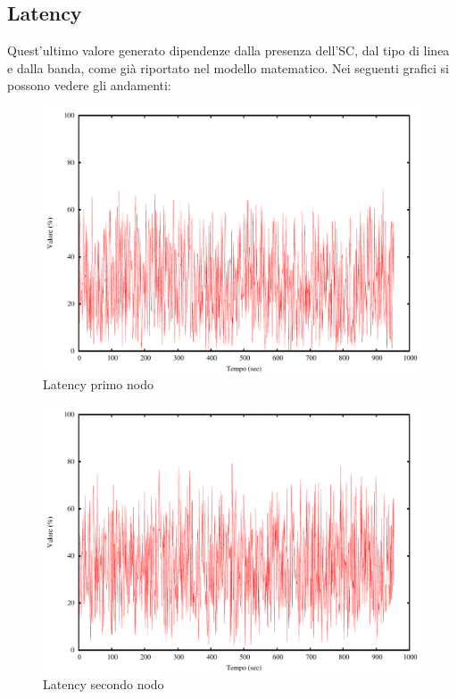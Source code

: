 \subsection{Latency}
Quest'ultimo valore generato dipendenze dalla presenza dell'SC, dal tipo di linea e dalla banda, come già riportato nel modello matematico. Nei seguenti grafici si possono vedere gli andamenti:
\begin{figure}[H]
\begin{center}
\includegraphics[scale=0.6]{etc/latency1.pdf}
\caption{Latency primo nodo}
\label{fig:latency1}
\end{center}
\end{figure}
\begin{figure}[H]
\begin{center}
\includegraphics[scale=0.6]{etc/latency2.pdf}
\caption{Latency secondo nodo}
\label{fig:latency2}
\end{center}
\end{figure}
